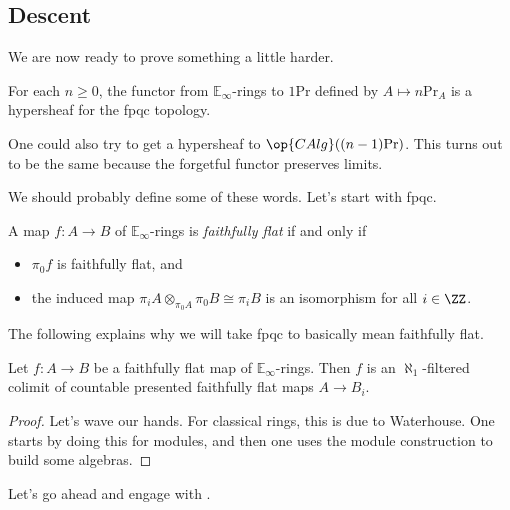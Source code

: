 \documentclass[../notes.tex]{subfiles}
\begin{document}
\subsection{Descent}
We are now ready to prove something a little harder.
\begin{theorem}[Descent] \label{thm:descent}
	For each $n\ge0$, the functor from $\mathbb E_\infty$-rings to $1\mathrm{Pr}$ defined by $A\mapsto n\mathrm{Pr}_A$ is a hypersheaf for the fpqc topology.
\end{theorem}
\begin{remark}
	One could also try to get a hypersheaf to $\op{CAlg}((n-1)\mathrm{Pr})$. This turns out to be the same because the forgetful functor preserves limits.
\end{remark}
We should probably define some of these words. Let's start with fpqc.
\begin{definition}
	A map $f\colon A\to B$ of $\mathbb E_\infty$-rings is \textit{faithfully flat} if and only if
	\begin{itemize}
		\item $\pi_0f$ is faithfully flat, and
		\item the induced map $\pi_iA\otimes_{\pi_0A}\pi_0B\cong\pi_iB$ is an isomorphism for all $i\in\ZZ$.
	\end{itemize}
\end{definition}
The following explains why we will take fpqc to basically mean faithfully flat.
\begin{lemma} \label{lem:reduce-to-countably-presented}
	Let $f\colon A\to B$ be a faithfully flat map of $\mathbb E_\infty$-rings. Then $f$ is an $\aleph_1$-filtered colimit of countable presented faithfully flat maps $A\to B_i$.
\end{lemma}
\begin{proof}
	Let's wave our hands. For classical rings, this is due to Waterhouse. One starts by doing this for modules, and then one uses the module construction to build some algebras.
\end{proof}
Let's go ahead and engage with .
\end{document}
